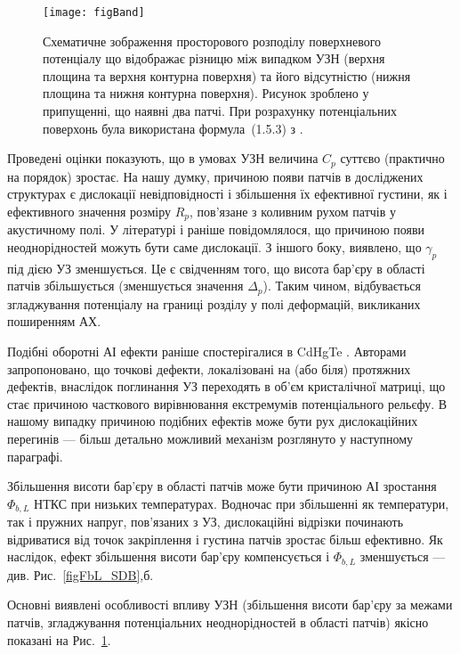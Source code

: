 \begin{figure}
\center
\texttt{[image: figBand]}
\caption{\label{figBand}
Схематичне зображення
просторового розподілу поверхневого потенціалу
що відображає різницю між випадком УЗН (верхня площина та верхня контурна поверхня) та
його відсутністю (нижня площина та нижня контурна поверхня).
Рисунок зроблено у припущенні, що наявні два патчі.
При розрахунку потенціальних поверхонь була використана формула~(1.5.3) з \cite{Tung:MSE}.
}%
\end{figure}

Проведені оцінки показують,
що в умовах УЗН величина $C_p$ суттєво (практично на порядок) зростає.
На нашу думку, причиною появи патчів в досліджених структурах є дислокації невідповідності і збільшення їх ефективної густини, як і ефективного значення розміру $R_p$,
пов'язане з коливним рухом патчів у акустичному полі.
У літературі \cite{GELCZUK2014} і раніше повідомлялося, що причиною появи неоднорідностей можуть бути саме дислокації.
З іншого боку, виявлено, що $\gamma_p$ під дією УЗ зменшується.
Це є свідченням того, що висота бар'єру в області патчів збільшується (зменшується значення $\Delta_p$).
Таким чином, відбувається згладжування потенціалу на границі розділу у полі деформацій, викликаних поширенням АХ.

Подібні оборотні АІ ефекти раніше спостерігалися в CdHgTe \cite{Vlasenko2000r}.
Авторами \cite{Vlasenko2000r} запропоновано, що точкові дефекти, локалізовані на (або біля) протяжних дефектів, внаслідок поглинання УЗ переходять в об'єм кристалічної матриці,
що стає причиною часткового вирівнювання екстремумів потенціального рельєфу.
В нашому  випадку причиною подібних ефектів може бути рух дислокаційних перегинів --- більш детально можливий механізм розглянуто у наступному параграфі.

Збільшення висоти бар'єру в області патчів може бути причиною АІ зростання $\Phi_{b,L}$ НТКС при низьких температурах.
Водночас при збільшенні як температури, так і пружних напруг, пов'язаних з УЗ,
дислокаційні відрізки починають відриватися від точок закріплення
 і густина патчів зростає більш ефективно.
Як наслідок, ефект збільшення висоти бар'єру компенсується і $\Phi_{b,L}$ зменшується --- див. Рис.~\ref{figFbL_SDB},б.


Основні виявлені особливості впливу УЗН (збільшення висоти бар'єру за межами патчів, згладжування потенціальних неоднорідностей в області патчів) якісно показані на Рис.~\ref{figBand}.





